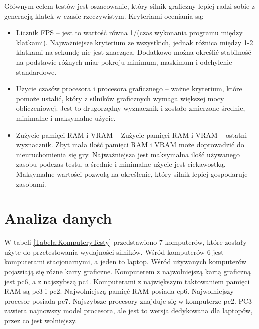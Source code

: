 \documentclass[12pt,twoside]{article}
\begin{document}
\newpage

Głównym celem testów jest oszacowanie, który silnik graficzny lepiej radzi sobie
z generacją klatek w czasie rzeczywistym. Kryteriami oceniania są:

\begin{itemize}
\item Licznik FPS – jest to wartość równa 1/(czas wykonania programu między
klatkami). Najważniejsze kryterium ze wszystkich, jednak różnica między 1-2
klatkami na sekundę nie jest znacząca. Dodatkowo można określić stabilność na
podstawie różnych miar pokroju minimum, maskimum i odchylenie standardowe. 
\item Użycie czasów procesora i procesora graficznego – ważne kryterium, które
pomoże ustalić, który z silników graficznych wymaga większej mocy obliczeniowej.
Jest to drugorzędny wyznacznik i zostało zmierzone średnie, minimalne i maksymalne użycie. 
\item Zużycie pamięci RAM i VRAM – Zużycie pamięci RAM i VRAM – ostatni
wyznacznik. Zbyt mała ilość pamięci RAM i VRAM może doprowadzić do
nieuruchomienia się gry.  Najważniejsza jest maksymalna ilość używanego zasobu
podczas testu, a średnie i minimalne użycie jest ciekawostką. Maksymalne
wartości pozwolą na określenie, który silnik lepiej gospodaruje zasobami. 
\end{itemize}


\clearpage
\section{Analiza danych}

W tabeli \ref{Tabela:KomputeryTesty} przedstawiono 7 komputerów, które zostały
użyte do przetestowania wydajności silników. Wśród komputerów 6 jest komputerami
stacjonarnymi, a jeden to laptop. Wśród używanych komputerów pojawiają się różne
karty graficzne. Komputerem z najwolniejszą kartą graficzną jest pc6, a z
najszybszą pc4. Komputerami z największym taktowaniem pamięci RAM są pc3
i pc2. Najwolniejszą pamięć RAM posiada cp6. Najwolniejszy procesor posiada pc7.
Najszybsze procesory znajduje się w komputerze pc2. PC3 zawiera najnowszy model
procesora, ale jest to wersja dedykowana dla laptopów, przez co jest wolniejszy.  
\end{document}
